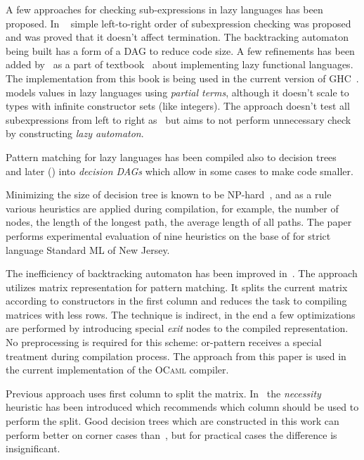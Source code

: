 A few approaches for checking sub-expressions in lazy languages has been proposed. In ~\cite{augustsson1985a } simple left-to-right order of subexpression checking was proposed and was proved that it doesn't affect termination. The backtracking automaton being built has a form of a DAG to reduce code size. A few refinements has been added by~\cite{wadler1987} as a part of textbook~\cite{peytonjones1987} about implementing lazy functional languages. The implementation from this book is being used in the current version of GHC~\cite{ghc}. \cite{laville1991} models values in lazy languages
using \emph{partial terms}, although it doesn't scale to types with infinite constructor sets (like integers). The approach doesn't test all subexpressions from left to right as~\cite{augustsson1985} but aims to not perform unnecessary check by constructing \emph{lazy automaton}. 

Pattern matching for lazy languages has been compiled also to decision trees~\cite{maranget1992} and later (\cite{maranget1994}) into
\emph{decision DAGs} which allow in some cases to make code smaller.

Minimizing the size of decision tree is known to be NP-hard~\cite{baudinet1985tree}, and as a rule various heuristics are applied during compilation, for example, the number of nodes,
the length of the longest path, the average length of all paths. The paper~\cite{Scott2000WhenDM} performs experimental evaluation of nine heuristics on the base of for strict language Standard ML of New Jersey.

The inefficiency of backtracking automaton has been
improved in~\cite{maranget2001}. The approach utilizes matrix representation for pattern matching. It splits the current matrix according to constructors in the
first column and reduces the task to compiling matrices with less rows. The technique is indirect, in the end a few optimizations are performed by introducing
special \emph{exit} nodes to the compiled representation. No preprocessing is required for this scheme: or-pattern receives a special treatment during compilation process.
The approach from this paper is used in the current implementation of the \textsc{OCaml} compiler.

Previous approach uses first column to split the matrix. In~\cite{maranget2008} the \emph{necessity} heuristic has been introduced which recommends which column should be
used to perform the split. Good decision trees which are constructed in this work can perform better on corner cases than~\cite{maranget2001}, but for practical cases the
difference is insignificant.



